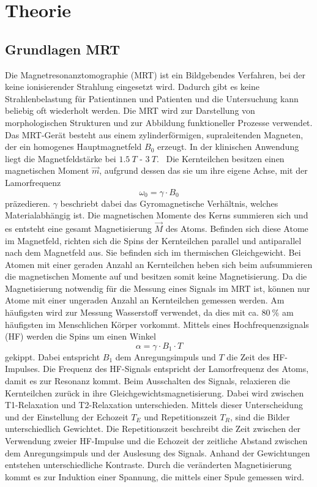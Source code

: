 \chapter{Theorie}

\section{Grundlagen MRT}
Die Magnetresonanztomographie (MRT) ist ein Bildgebendes Verfahren, bei der keine ionisierender Strahlung eingesetzt wird.
Dadurch gibt es keine Strahlenbelastung für Patientinnen und Patienten und die Untersuchung kann beliebig oft wiederholt werden.
Die MRT wird zur Darstellung von morphologischen Strukturen und zur Abbildung funktioneller Prozesse verwendet.
Das MRT-Gerät besteht aus einem zylinderförmigen, supraleitenden Magneten, der ein homogenes Hauptmagnetfeld $B_0$ erzeugt. %
In der klinischen Anwendung liegt die Magnetfeldstärke bei $\qty{1.5}{T}$ - $\qty{3}{T}$.~\cite{Schlegel}
Die Kernteilchen besitzen einen magnetischen Moment $\vec{m}$, aufgrund dessen das sie um ihre eigene Achse, mit der Lamorfrequenz 
\begin{equation}
    \omega_0 = \gamma \cdot B_0
\end{equation}
präzedieren. $\gamma$ beschriebt dabei das Gyromagnetische Verhältnis, welches Materialabhängig ist.
Die magnetischen Momente des Kerns summieren sich und es entsteht eine gesamt Magnetisierung $\vec{M}$ des Atoms. Befinden sich diese Atome im Magnetfeld,
richten sich die Spins der Kernteilchen parallel und antiparallel nach dem Magnetfeld aus. Sie befinden sich im thermischen Gleichgewicht.
Bei Atomen mit einer geraden Anzahl an Kernteilchen heben sich beim aufsummieren die magnetischen Momente auf und besitzen somit keine
Magnetisierung. 
Da die Magnetisierung notwendig für die Messung eines Signals im MRT ist, können nur Atome mit einer ungeraden Anzahl an Kernteilchen gemessen werden.
Am häufigsten wird zur Messung Wasserstoff verwendet, da dies mit ca. $\qty{80}{\%}$ am häufigsten im Menschlichen Körper vorkommt.
Mittels eines Hochfrequenzsignals (HF) werden die Spins um einen Winkel
\begin{equation}
    \alpha = \gamma \cdot B_1 \cdot T 
\end{equation}
gekippt. Dabei entspricht $B_1$ dem Anregungsimpuls und $T$ die Zeit des HF-Impulses.
Die Frequenz des HF-Signals entspricht der Lamorfrequenz des Atoms, damit es zur Resonanz kommt. 
Beim Ausschalten des Signals, relaxieren die Kernteilchen zurück in ihre Gleichgewichtsmagnetisierung. 
Dabei wird zwischen T1-Relaxation und T2-Relaxation unterschieden. Mittels dieser Unterscheidung und der Einstellung der Echozeit $T_E$ und 
Repetitionszeit $T_R$, sind die Bilder unterschiedlich Gewichtet.
Die Repetitionszeit beschreibt die Zeit zwischen der Verwendung zweier HF-Impulse und die Echozeit der zeitliche Abstand zwischen dem Anregungsimpuls und der Auslesung des Signals. 
Anhand der Gewichtungen entstehen unterschiedliche Kontraste.
Durch die veränderten Magnetisierung kommt es zur Induktion einer Spannung, die mittels einer Spule gemessen wird.


